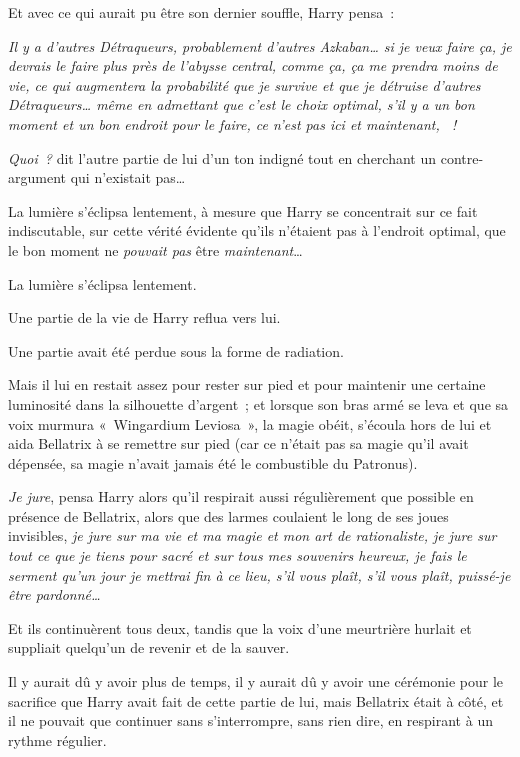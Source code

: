 Et avec ce qui aurait pu être son dernier souffle, Harry pensa~:

\emph{Il y a d'autres Détraqueurs, probablement d'autres Azkaban… si je veux faire ça, je devrais le faire plus près de l'abysse central, comme ça, ça me prendra moins de vie, ce qui augmentera la probabilité que je survive et que je détruise d'autres Détraqueurs… même en admettant que c'est le choix optimal, s'il y a un bon moment et un bon endroit pour le faire, ce n'est pas ici et maintenant, ~!}

\emph{Quoi~?} dit l'autre partie de lui d'un ton indigné tout en cherchant un contre-argument qui n'existait pas…

La lumière s'éclipsa lentement, à mesure que Harry se concentrait sur ce fait indiscutable, sur cette vérité évidente qu'ils n'étaient pas à l'endroit optimal, que le bon moment ne \emph{pouvait pas} être \emph{maintenant}…

La lumière s'éclipsa lentement.

Une partie de la vie de Harry reflua vers lui.

Une partie avait été perdue sous la forme de radiation.

Mais il lui en restait assez pour rester sur pied et pour maintenir une certaine luminosité dans la silhouette d'argent~; et lorsque son bras armé se leva et que sa voix murmura «~Wingardium Leviosa~», la magie obéit, s'écoula hors de lui et aida Bellatrix à se remettre sur pied (car ce n'était pas sa magie qu'il avait dépensée, sa magie n'avait jamais été le combustible du Patronus).

\emph{Je jure}, pensa Harry alors qu'il respirait aussi régulièrement que possible en présence de Bellatrix, alors que des larmes coulaient le long de ses joues invisibles, \emph{je jure sur ma vie et ma magie et mon art de rationaliste, je jure sur tout ce que je tiens pour sacré et sur tous mes souvenirs heureux, je fais le serment qu'un jour je mettrai fin à ce lieu, s'il vous plaît, s'il vous plaît, puissé-je être pardonné…}

Et ils continuèrent tous deux, tandis que la voix d'une meurtrière hurlait et suppliait quelqu'un de revenir et de la sauver.

Il y aurait dû y avoir plus de temps, il y aurait dû y avoir une cérémonie pour le sacrifice que Harry avait fait de cette partie de lui, mais Bellatrix était à côté, et il ne pouvait que continuer sans s'interrompre, sans rien dire, en respirant à un rythme régulier.

